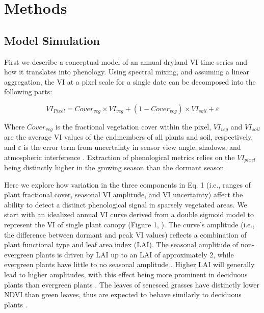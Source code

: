 \documentclass{article}
\begin{document}
\section{Methods}

\subsection{Model Simulation}

First we describe a conceptual model of an annual dryland VI time series and how it translates into phenology. Using spectral mixing, and assuming a linear aggregation, the VI at a pixel scale for a single date can be decomposed into the following parts:

\begin{equation}
VI_{Pixel} = Cover_{veg}\times VI_{veg} + (1-Cover_{veg})\times VI_{soil} + \varepsilon 
\end{equation}

Where $Cover_{veg}$ is the fractional vegetation cover within the pixel, $VI_{veg}$ and $VI_{soil}$ are the average VI values of the endmembers of all plants and soil, respectively, and $\varepsilon$ is the error term from uncertainty in sensor view angle, shadows, and atmospheric interference \cite{huete1994, jiang2006}. Extraction of phenological metrics relies on the $VI_{pixel}$ being distinctly higher in the growing season than the dormant season.

Here we explore how variation in the three components in Eq. 1 (i.e., ranges of plant fractional cover, seasonal VI amplitude, and VI uncertainty) affect the ability to detect a distinct phenological signal in sparsely vegetated areas. We start with an idealized annual VI curve derived from a double sigmoid model to represent the VI of single plant canopy (Figure 1, \cite{elmore2012}). The curve’s amplitude (i.e., the difference between dormant and peak VI values) reflects a combination of plant functional type and leaf area index (LAI). The seasonal amplitude of non-evergreen plants is driven by LAI up to an LAI of approximately 2, while evergreen plants have little to no seasonal amplitude \cite{gamon1995, carlson1997}. Higher LAI will generally lead to higher amplitudes, with this effect being more prominent in deciduous plants than evergreen plants \cite{baghzouz2010, smith2019}. The leaves of senesced grasses have distinctly lower NDVI than green leaves, thus are expected to behave similarly to deciduous plants \cite{huete1987}.
\end{document}
